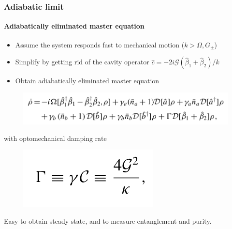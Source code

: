 \documentclass[aspectratio=43]{beamer}
\begin{document}
\begin{frame}
	
	\frametitle{Adiabatic limit}
	\framesubtitle{Adiabatically eliminated master equation}
	
	\begin{itemize}
		\item Assume the system responds fast to mechanical motion ($k > \Omega, G_{\pm}$)
		\item Simplify by getting rid of the cavity operator $\hat{c} = -2i\mathcal{G}(\hat{\beta}_{1} + \hat{\beta}_{2})/k$\\
		\item Obtain adiabatically eliminated master equation
	\end{itemize}

	\begin{figure}
		\includegraphics[width = 9 cm]{plots/master_eq_2.png}
	\end{figure}

	with optomechanical damping rate
	\begin{figure}
		\includegraphics[width = 3 cm]{plots/optomechanic_dumping.png}
	\end{figure}

	Easy to obtain steady state, and to measure entanglement and purity.
	 
\end{frame}
\end{document}
